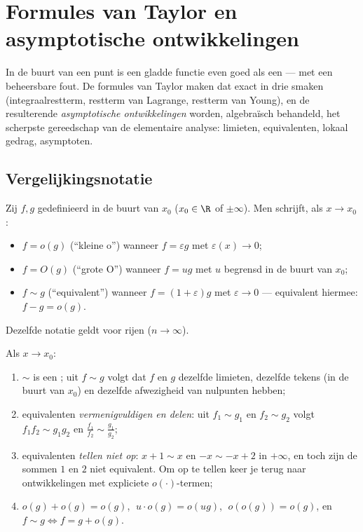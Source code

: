 \chapter{Formules van Taylor en asymptotische ontwikkelingen}\label{ch:b1:taylor}

In de buurt van een punt is een gladde functie even goed als een
 --- met een beheersbare fout. De formules van Taylor maken
dat exact in drie smaken (integraalrestterm, restterm van Lagrange,
restterm van Young), en de resulterende \emph{asymptotische
ontwikkelingen} worden, algebraïsch behandeld, het scherpste
gereedschap van de elementaire analyse: limieten, equivalenten,
lokaal gedrag, asymptoten.

\section{Vergelijkingsnotatie}

\begin{definition}\label{def:b1:taylor:landau}
Zij $f, g$ gedefinieerd in de buurt van $x_0$ ($x_0 \in \R$ of
$\pm\infty$). Men schrijft, als $x \to x_0$:
\begin{itemize}
  \item $f = o(g)$ (``kleine o'') wanneer $f = \varepsilon g$ met
        $\varepsilon(x) \to 0$;
  \item $f = O(g)$ (``grote O'') wanneer $f = u g$ met $u$ begrensd
        in de buurt van $x_0$;
  \item $f \sim g$ (``equivalent'')
        wanneer $f = (1 + \varepsilon) g$ met $\varepsilon \to 0$
        --- equivalent hiermee: $f - g = o(g)$.
\end{itemize}
Dezelfde notatie geldt voor rijen ($n \to \infty$).
\end{definition}

\begin{proposition}[Rekenregels]\label{prop:b1:taylor:landaurules}
Als $x \to x_0$:
\begin{enumerate}
  \item $\sim$ is een ; uit $f \sim g$ volgt dat
        $f$ en $g$ dezelfde limieten, dezelfde tekens (in de buurt
        van $x_0$) en dezelfde afwezigheid van nulpunten hebben;
  \item equivalenten \emph{vermenigvuldigen en delen}: uit $f_1 \sim
        g_1$ en $f_2 \sim g_2$ volgt $f_1 f_2 \sim g_1 g_2$ en
        $\frac{f_1}{f_2} \sim \frac{g_1}{g_2}$;
  \item equivalenten \emph{tellen niet op}: $x + 1 \sim x$ en $-x
        \sim -x + 2$ in $+\infty$, en toch zijn de sommen $1$ en $2$
        niet equivalent. Om op te tellen keer je terug naar
        ontwikkelingen met expliciete $o(\cdot)$-termen;
  \item $o(g) + o(g) = o(g)$, $\;u \cdot o(g) = o(ug)$, $\;o(o(g)) =
        o(g)$, en $f \sim g \iff f = g + o(g)$.
\end{enumerate}
\end{proposition}

